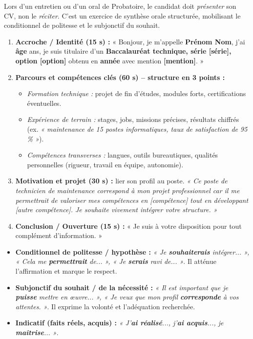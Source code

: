 \documentclass[11pt]{article}
\begin{document}
Lors d'un entretien ou d'un oral de Probatoire, le candidat doit \emph{présenter} son CV, non le \emph{réciter}. C'est un exercice de synthèse orale structurée, mobilisant le conditionnel de politesse et le subjonctif du souhait.

\begin{methode}
\begin{enumerate}
    \item \textbf{Accroche / Identité (15 s) :} « Bonjour, je m'appelle \textbf{Prénom Nom}, j'ai \textbf{âge} ans, je suis titulaire d'un \textbf{Baccalauréat technique, série [série], option [option]} obtenu en \textbf{année} avec mention \textbf{[mention]}. »
    \item \textbf{Parcours et compétences clés (60 s) -- structure en 3 points :}
    \begin{itemize}
        \item \emph{Formation technique :} projet de fin d'études, modules forts, certifications éventuelles.
        \item \emph{Expérience de terrain :} stages, jobs, missions précises, résultats chiffrés (ex. \emph{« maintenance de 15 postes informatiques, taux de satisfaction de 95\,\% »}).
        \item \emph{Compétences transverses :} langues, outils bureautiques, qualités personnelles (rigueur, travail en équipe, autonomie).
    \end{itemize}
    \item \textbf{Motivation et projet (30 s) :} lier son profil au poste. \emph{« Ce poste de technicien de maintenance correspond à mon projet professionnel car il me permettrait de valoriser mes compétences en [compétence] tout en développant [autre compétence]. Je souhaite vivement intégrer votre structure. »}
    \item \textbf{Conclusion / Ouverture (15 s) :} « Je suis à votre disposition pour tout complément d'information. »
\end{enumerate}
\end{methode}

\begin{aretenir}
\begin{itemize}
    \item \textbf{Conditionnel de politesse / hypothèse :} \emph{« Je \textbf{souhaiterais} intégrer... », « Cela me \textbf{permettrait} de... », « Je \textbf{serais} ravi de... »}. Il atténue l'affirmation et marque le respect.
    \item \textbf{Subjonctif du souhait / de la nécessité :} \emph{« Il est important que je \textbf{puisse} mettre en œuvre... », « Je veux que mon profil \textbf{corresponde} à vos attentes. »}. Il exprime la volonté et l'adéquation recherchée.
    \item \textbf{Indicatif (faits réels, acquis) :} \emph{« J'\textbf{ai réalisé}..., j'\textbf{ai acquis}..., je \textbf{maîtrise}... »}.
\end{itemize}
\end{aretenir}
\end{document}
